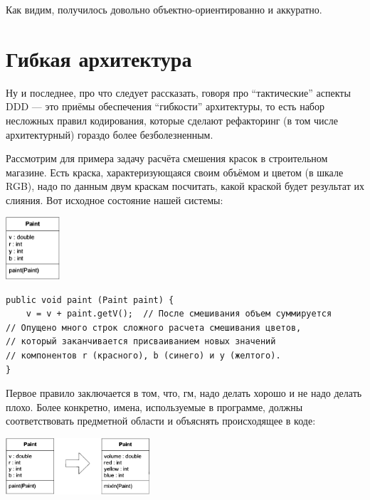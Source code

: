 \documentclass[a5paper]{article}
\begin{document}
Как видим, получилось довольно объектно-ориентированно и аккуратно.

\section{Гибкая архитектура}

Ну и последнее, про что следует рассказать, говоря про ``тактические'' аспекты DDD --- это приёмы обеспечения ``гибкости'' архитектуры, то есть набор несложных правил кодирования, которые сделают рефакторинг (в том числе архитектурный) гораздо более безболезненным.

Рассмотрим для примера задачу расчёта смешения красок в строительном магазине. Есть краска, характеризующаяся своим объёмом и цветом (в шкале RGB), надо по данным двум краскам посчитать, какой краской будет результат их слияния. Вот исходное состояние нашей системы:

\begin{center}
    \includegraphics[width=0.15\textwidth]{originalPaint.png}
\end{center}

\begin{verbatim}
public void paint (Paint paint) {
    v = v + paint.getV();  // После смешивания объем суммируется
// Опущено много строк сложного расчета смешивания цветов,
// который заканчивается присваиванием новых значений
// компонентов r (красного), b (синего) и y (желтого).
}
\end{verbatim}

Первое правило заключается в том, что, гм, надо делать хорошо и не надо делать плохо. Более конкретно, имена, используемые в программе, должны соответствовать предметной области и объяснять происходящее в коде:

\begin{center}
    \includegraphics[width=0.4\textwidth] {informativeInterfaceForPaint.png}
\end{center}
\end{document}
